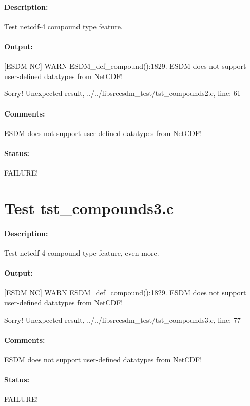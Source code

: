 \paragraph{Description:} Test netcdf-4 compound type feature.

\paragraph{Output:} [ESDM NC] WARN ESDM\_def\_compound():1829. ESDM does not support user-defined datatypes from NetCDF!

Sorry! Unexpected result, ../../libsrcesdm\_test/tst\_compounds2.c, line: 61

\paragraph{Comments:} ESDM does not support user-defined datatypes from NetCDF!

\paragraph{Status:} FAILURE!

\section{Test tst\_compounds3.c}

\paragraph{Description:} Test netcdf-4 compound type feature, even more.

\paragraph{Output:} [ESDM NC] WARN ESDM\_def\_compound():1829. ESDM does not support user-defined datatypes from NetCDF!

Sorry! Unexpected result, ../../libsrcesdm\_test/tst\_compounds3.c, line: 77

\paragraph{Comments:} ESDM does not support user-defined datatypes from NetCDF!

\paragraph{Status:} FAILURE!


